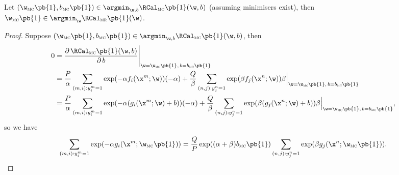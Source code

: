 \begin{theorem}
Let $(\w_\textsc{mc}\pb{1}, b_\textsc{mc}\pb{1}) \in \argmin_{\w, b} \RCal_\textsc{mc}\pb{1}(\w, b)$ (assuming minimisers exist),
then $\w_\textsc{mc}\pb{1} \in \argmin_{\w} \RCal_\textsc{mr}\pb{1}(\w)$.
\end{theorem}


\begin{proof}
Suppose $(\w_\textsc{mc}\pb{1}, b_\textsc{mc}\pb{1}) \in \argmin_{\w, b} \RCal_\textsc{mc}\pb{1}(\w, b)$, then
\begin{equation*}
\begin{aligned}
0 
&= \frac{\partial \, \RCal_\textsc{mc}\pb{1}(\w, b)} {\partial \, b} \Bigg|_{\w = \w_\textsc{mc}\pb{1}, \, b = b_\textsc{mc}\pb{1}} \\
&= \frac{P}{\alpha} \sum_{(m,i): y_i^m = 1} \exp(-\alpha f_i(\x^m; \w)) (-\alpha) +
   \frac{Q}{\beta } \sum_{(n,j): y_j^n = 1} \exp( \beta  f_j(\x^n; \w)) \beta
   \Big|_{\w = \w_\textsc{mc}\pb{1}, \, b = b_\textsc{mc}\pb{1}} \\
&= \frac{P}{\alpha} \sum_{(m,i): y_i^m = 1} \exp(-\alpha (g_i(\x^m; \w) + b)) (-\alpha) +
   \frac{Q}{\beta } \sum_{(n,j): y_j^n = 1} \exp( \beta  (g_j(\x^n; \w) + b)) \beta
   \Big|_{\w = \w_\textsc{mc}\pb{1}, \, b = b_\textsc{mc}\pb{1}},
\end{aligned}
\end{equation*}
so we have
\begin{equation}
\label{eq:skew_ml}
\sum_{(m,i): y_i^m = 1} \exp(-\alpha g_i(\x^m; \w_\textsc{mc}\pb{1})) 
= \frac{Q}{P} \exp((\alpha + \beta) b_\textsc{mc}\pb{1}) \sum_{(n,j): y_j^n = 1} \exp( \beta  g_j(\x^n; \w_\textsc{mc}\pb{1})).
\end{equation}


\end{proof}
